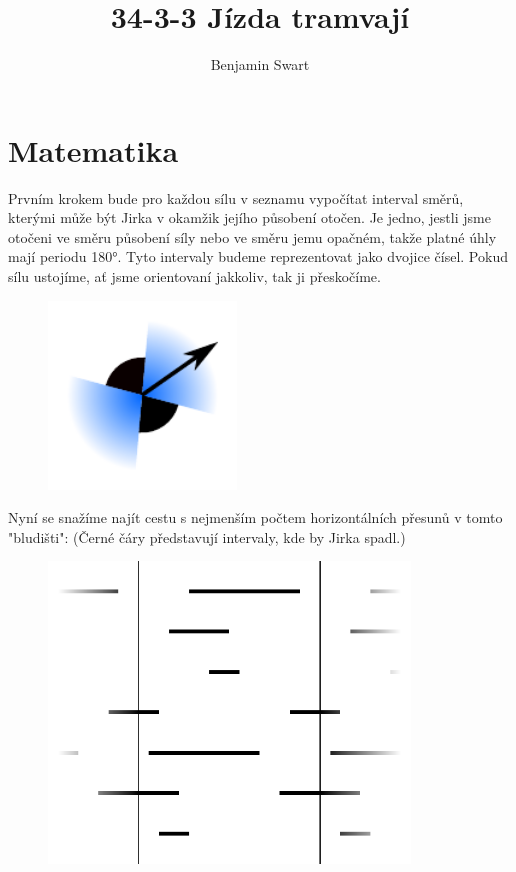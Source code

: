 \documentclass{article}
\title{34-3-3 Jízda tramvají}
\author{Benjamin Swart}
\begin{document}
\maketitle

\section{Matematika}

Prvním krokem bude pro každou sílu v seznamu vypočítat interval směrů, kterými může být Jirka v okamžik jejího působení otočen. Je jedno, jestli jsme otočeni ve směru působení síly nebo ve směru jemu opačném, takže platné úhly mají periodu 180°. Tyto intervaly budeme reprezentovat jako dvojice čísel. Pokud sílu ustojíme, ať jsme orientovaní jakkoliv, tak ji přeskočíme.

\begin{figure}[H]
    \centering
    \includegraphics[width=5cm]{angles.pdf}
\end{figure}

Nyní se snažíme najít cestu s nejmenším počtem horizontálních přesunů v tomto "bludišti": (Černé čáry představují intervaly, kde by Jirka spadl.)

\begin{figure}[H]
    \centering
    \includegraphics[height=8cm]{waterfall/empty.pdf}
\end{figure}
\end{document}
